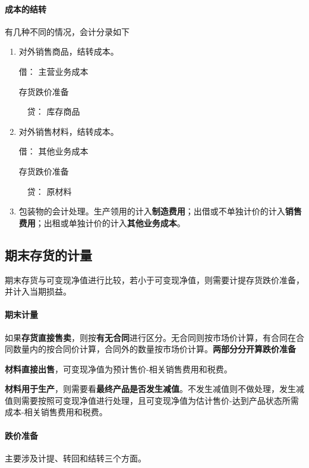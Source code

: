 \documentclass[UTF8,12pt]{ctexart}
\newenvironment{Dr}{\noindent 借：}{\par}
\newenvironment{Cr}{\noindent \ \ 贷：}{\par}
\numberwithin{equation}{section} %
\numberwithin{figure}{section}
\numberwithin{table}{section}
\begin{document}
	\paragraph{成本的结转} 有几种不同的情况，会计分录如下
	\begin{enumerate}
		\item 对外销售商品，结转成本。
		
		\begin{Dr}
			主营业务成本
			
			存货跌价准备
		\end{Dr}
		\begin{Cr}
			库存商品
		\end{Cr}
		
		\item 对外销售材料，结转成本。
		
		\begin{Dr}
			其他业务成本
			
			存货跌价准备
		\end{Dr}
		\begin{Cr}
			原材料
		\end{Cr}
		
		\item 包装物的会计处理。生产领用的计入\textbf{制造费用}；出借或不单独计价的计入\textbf{销售费用}；出租或单独计价的计入\textbf{其他业务成本}。
	\end{enumerate}
	
	\subsection{期末存货的计量}
	期末存货与可变现净值进行比较，若小于可变现净值，则需要计提存货跌价准备，并计入当期损益。
	
	\paragraph{期末计量}
	如果\textbf{存货直接售卖}，则按\textbf{有无合同}进行区分。无合同则按市场价计算，有合同在合同数量内的按合同价计算，合同外的数量按市场价计算。\textbf{两部分分开算跌价准备}
	
	\textbf{材料直接出售}，可变现净值为预计售价-相关销售费用和税费。
	
	\textbf{材料用于生产}，则需要看\textbf{最终产品是否发生减值}。不发生减值则不做处理，发生减值则需要按照可变现净值进行处理，且可变现净值为估计售价-达到产品状态所需成本-相关销售费用和税费。
	
	\paragraph{跌价准备} 主要涉及计提、转回和结转三个方面。
	
\end{document}
